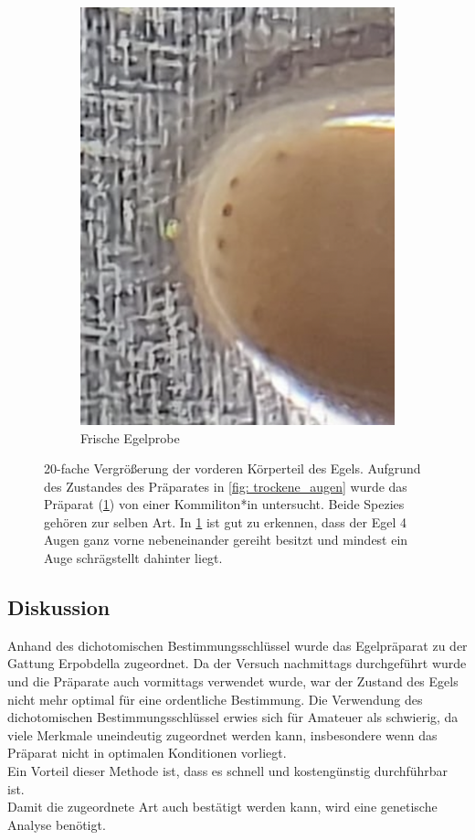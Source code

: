 \documentclass[oneside,10pt,a4paper]{report}
\begin{document}
\begin{figure}[H]
\begin{subfigure}[b]{0.37\textwidth}
						\includegraphics[width=\textwidth]{Dichotom_augen}
						\caption{Frische Egelprobe}
						\label{fig:feuchte_augen}
					\end{subfigure}
					\caption{20-fache Vergrößerung der vorderen Körperteil des Egels. Aufgrund des Zustandes des Präparates in \ref{fig: trockene_augen} wurde das Präparat (\ref{fig:feuchte_augen}) von einer Kommiliton*in  untersucht. Beide Spezies gehören zur selben Art. In \ref{fig:feuchte_augen} ist gut zu erkennen, dass der Egel 4 Augen ganz vorne nebeneinander gereiht besitzt und mindest ein Auge schrägstellt dahinter liegt.}
					\label{fig: Dicho_augent}
				\end{figure}
			
			
			\subsection{Diskussion}
				Anhand des dichotomischen Bestimmungsschlüssel wurde das Egelpräparat zu der Gattung Erpobdella zugeordnet.
				Da der Versuch nachmittags durchgeführt wurde und die Präparate auch vormittags verwendet wurde, war der Zustand des Egels nicht mehr optimal für eine ordentliche Bestimmung.
				Die Verwendung des dichotomischen Bestimmungsschlüssel erwies sich für Amateuer als schwierig, da viele Merkmale uneindeutig zugeordnet werden kann, insbesondere wenn das Präparat nicht in optimalen Konditionen vorliegt.\\
				Ein Vorteil dieser Methode ist, dass es schnell und kostengünstig durchführbar ist.\\
				Damit die zugeordnete Art auch bestätigt werden kann, wird eine genetische Analyse benötigt. 
		
\end{document}

